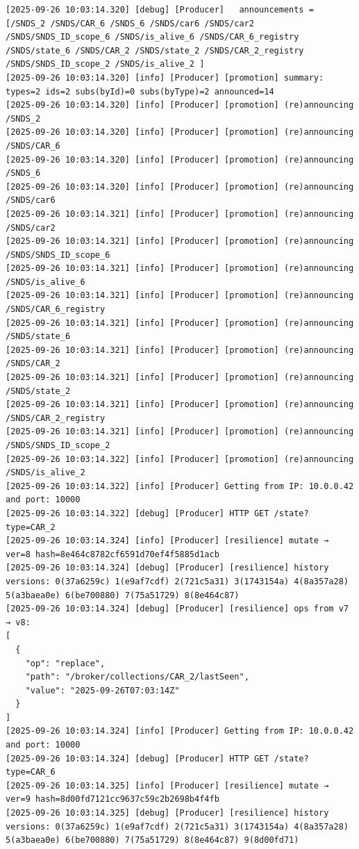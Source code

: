 \documentclass{article}
\begin{document}
\begin{lstlisting}[language=log, caption={Recovery of Node C through Node G}, label={lst:recovery-of-node-c-g}]
[2025-09-26 10:03:14.320] [debug] [Producer]   announcements = [/SNDS_2 /SNDS/CAR_6 /SNDS_6 /SNDS/car6 /SNDS/car2 /SNDS/SNDS_ID_scope_6 /SNDS/is_alive_6 /SNDS/CAR_6_registry /SNDS/state_6 /SNDS/CAR_2 /SNDS/state_2 /SNDS/CAR_2_registry /SNDS/SNDS_ID_scope_2 /SNDS/is_alive_2 ]
[2025-09-26 10:03:14.320] [info] [Producer] [promotion] summary: types=2 ids=2 subs(byId)=0 subs(byType)=2 announced=14
[2025-09-26 10:03:14.320] [info] [Producer] [promotion] (re)announcing /SNDS_2
[2025-09-26 10:03:14.320] [info] [Producer] [promotion] (re)announcing /SNDS/CAR_6
[2025-09-26 10:03:14.320] [info] [Producer] [promotion] (re)announcing /SNDS_6
[2025-09-26 10:03:14.320] [info] [Producer] [promotion] (re)announcing /SNDS/car6
[2025-09-26 10:03:14.321] [info] [Producer] [promotion] (re)announcing /SNDS/car2
[2025-09-26 10:03:14.321] [info] [Producer] [promotion] (re)announcing /SNDS/SNDS_ID_scope_6
[2025-09-26 10:03:14.321] [info] [Producer] [promotion] (re)announcing /SNDS/is_alive_6
[2025-09-26 10:03:14.321] [info] [Producer] [promotion] (re)announcing /SNDS/CAR_6_registry
[2025-09-26 10:03:14.321] [info] [Producer] [promotion] (re)announcing /SNDS/state_6
[2025-09-26 10:03:14.321] [info] [Producer] [promotion] (re)announcing /SNDS/CAR_2
[2025-09-26 10:03:14.321] [info] [Producer] [promotion] (re)announcing /SNDS/state_2
[2025-09-26 10:03:14.321] [info] [Producer] [promotion] (re)announcing /SNDS/CAR_2_registry
[2025-09-26 10:03:14.321] [info] [Producer] [promotion] (re)announcing /SNDS/SNDS_ID_scope_2
[2025-09-26 10:03:14.322] [info] [Producer] [promotion] (re)announcing /SNDS/is_alive_2
[2025-09-26 10:03:14.322] [info] [Producer] Getting from IP: 10.0.0.42 and port: 10000
[2025-09-26 10:03:14.322] [debug] [Producer] HTTP GET /state?type=CAR_2
[2025-09-26 10:03:14.324] [info] [Producer] [resilience] mutate → ver=8 hash=8e464c8782cf6591d70ef4f5885d1acb
[2025-09-26 10:03:14.324] [debug] [Producer] [resilience] history versions: 0(37a6259c) 1(e9af7cdf) 2(721c5a31) 3(1743154a) 4(8a357a28) 5(a3baea0e) 6(be700880) 7(75a51729) 8(8e464c87) 
[2025-09-26 10:03:14.324] [debug] [Producer] [resilience] ops from v7 → v8:
[
  {
    "op": "replace",
    "path": "/broker/collections/CAR_2/lastSeen",
    "value": "2025-09-26T07:03:14Z"
  }
]
[2025-09-26 10:03:14.324] [info] [Producer] Getting from IP: 10.0.0.42 and port: 10000
[2025-09-26 10:03:14.324] [debug] [Producer] HTTP GET /state?type=CAR_6
[2025-09-26 10:03:14.325] [info] [Producer] [resilience] mutate → ver=9 hash=8d00fd7121cc9637c59c2b2698b4f4fb
[2025-09-26 10:03:14.325] [debug] [Producer] [resilience] history versions: 0(37a6259c) 1(e9af7cdf) 2(721c5a31) 3(1743154a) 4(8a357a28) 5(a3baea0e) 6(be700880) 7(75a51729) 8(8e464c87) 9(8d00fd71) 

\end{lstlisting}
\end{document}
